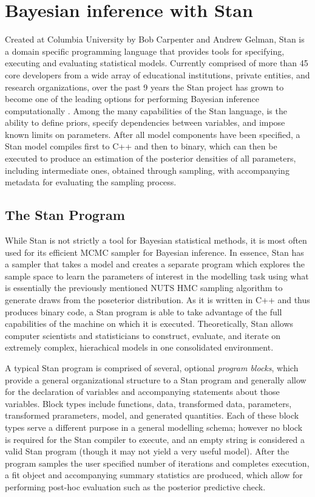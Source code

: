 \documentclass[
  12pt,
]{book}
\theoremstyle{definition}
\theoremstyle{definition}
\theoremstyle{definition}
\theoremstyle{remark}
\begin{document}
\hypertarget{bayesian-inference-with-stan}{%
\chapter{Bayesian inference with Stan}\label{bayesian-inference-with-stan}}

Created at Columbia University by Bob Carpenter and Andrew Gelman, Stan is a domain specific programming language that provides tools for specifying, executing and evaluating statistical models.
Currently comprised of more than 45 core developers from a wide array of educational institutions, private entities, and research organizations, over the past 9 years the Stan project has grown to become one of the leading options for performing Bayesian inference computationally \citep{Stan2021}.
Among the many capabilities of the Stan language, is the ability to define priors, specify dependencies between variables, and impose known limits on parameters.
After all model components have been specified, a Stan model compiles first to C++ and then to binary, which can then be executed to produce an estimation of the posterior densities of all parameters, including intermediate ones, obtained through sampling, with accompanying metadata for evaluating the sampling process.

\hypertarget{the-stan-program}{%
\section{The Stan Program}\label{the-stan-program}}

While Stan is not strictly a tool for Bayesian statistical methods, it is most often used for its efficient MCMC sampler for Bayesian inference.
In essence, Stan has a sampler that takes a model and creates a separate program which explores the sample space to learn the parameters of interest in the modelling task using what is essentially the previously mentioned NUTS HMC sampling algorithm to generate draws from the poseterior distribution.
As it is written in C++ and thus produces binary code, a Stan program is able to take advantage of the full capabilities of the machine on which it is executed.
Theoretically, Stan allows computer scientists and statisticians to construct, evaluate, and iterate on extremely complex, hierachical models in one consolidated environment.

A typical Stan program is comprised of several, optional \emph{program blocks}, which provide a general organizational structure to a Stan program and generally allow for the declaration of variables and accompanying statements about those variables.
Block types include functions, data, transformed data, parameters, transformed prarameters, model, and generated quantities.
Each of these block types serve a different purpose in a general modelling schema; however no block is required for the Stan compiler to execute, and an empty string is considered a valid Stan program (though it may not yield a very useful model).
After the program samples the user specified number of iterations and completes execution, a fit object and accompanying summary statistics are produced, which allow for performing post-hoc evaluation such as the posterior predictive check.
\end{document}
